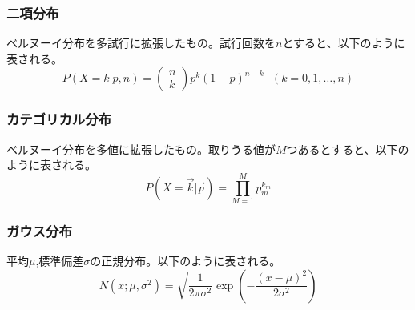 \documentclass[b5paper,12pt]{jarticle}
\begin{document}
\subsubsection{二項分布}
ベルヌーイ分布を多試行に拡張したもの。試行回数を$n$とすると、以下のように表される。
\[
    P(X=k|p,n)=\left(
        \begin{array}{c}
            n \\
            k 
        \end{array}
        \right)p^k(1-p)^{n-k} ~~~(k=0,1,\ldots,n)
\]
\subsubsection{カテゴリカル分布}
ベルヌーイ分布を多値に拡張したもの。取りうる値が$M$つあるとすると、以下のように表される。
\[
    P(X=\vec{k}|\vec{p})=\prod_{M=1}^M p_m^{k_m}
\]

\subsubsection{ガウス分布}
平均$\mu$,標準偏差$\sigma$の正規分布。以下のように表される。
\[
    N(x;\mu,\sigma^2)=\sqrt{\frac{1}{2\pi\sigma^2}}\exp\left(-\frac{(x-\mu)^2}{2\sigma^2}\right)
\]
\end{document}
